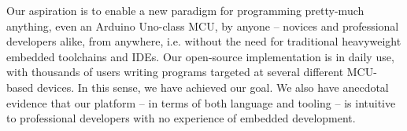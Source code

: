 Our aspiration is to enable a new paradigm for programming pretty-much anything, even an Arduino Uno-class MCU, by anyone -- novices and professional developers alike, from anywhere, i.e. without the need for traditional heavyweight embedded toolchains and IDEs. Our open-source implementation is in daily use, with thousands of users writing programs targeted at several different MCU-based devices. In this sense, we have achieved our goal. We also have anecdotal evidence that our platform -- in terms of both language and tooling -- is intuitive to professional developers with no experience of embedded development. 


